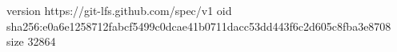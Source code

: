version https://git-lfs.github.com/spec/v1
oid sha256:e0a6e1258712fabcf5499c0dcae41b0711dacc53dd443f6c2d605c8fba3e8708
size 32864
